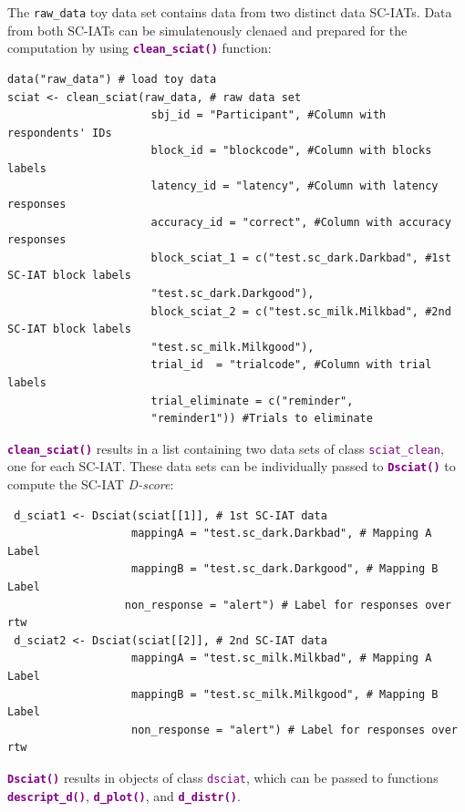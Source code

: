 \documentclass[a0,landscape]{a0poster}
\begin{document}
\begin{multicols*}{3}
The \texttt{raw\_data} toy data set contains data from two distinct data SC-IATs. Data from both SC-IATs can be simulatenously clenaed and prepared for the computation by using \textbf{\textcolor{purple}{\texttt{clean\_sciat()}}} function: 
\vspace{3mm}
\begin{lstlisting}
data("raw_data") # load toy data 
sciat <- clean_sciat(raw_data, # raw data set
                      sbj_id = "Participant", #Column with respondents' IDs
                      block_id = "blockcode", #Column with blocks labels
                      latency_id = "latency", #Column with latency responses
                      accuracy_id = "correct", #Column with accuracy responses
                      block_sciat_1 = c("test.sc_dark.Darkbad", #1st SC-IAT block labels
                      "test.sc_dark.Darkgood"),
                      block_sciat_2 = c("test.sc_milk.Milkbad", #2nd SC-IAT block labels
                      "test.sc_milk.Milkgood"),
                      trial_id  = "trialcode", #Column with trial labels
                      trial_eliminate = c("reminder", 
                      "reminder1")) #Trials to eliminate
\end{lstlisting}	
\vspace{3mm}

 \textbf{\textcolor{purple}{\texttt{clean\_sciat()}}} results in a list containing two data sets of class \textcolor{purple}{\texttt{sciat\_clean}}, one for each SC-IAT. These data sets can be individually passed to \textbf{\textcolor{purple}{\texttt{Dsciat()}}} to compute the SC-IAT \emph{D-score}: 
\vspace{3mm}
\begin{lstlisting}
 d_sciat1 <- Dsciat(sciat[[1]], # 1st SC-IAT data
                   mappingA = "test.sc_dark.Darkbad", # Mapping A Label
                   mappingB = "test.sc_dark.Darkgood", # Mapping B Label
                  non_response = "alert") # Label for responses over rtw
 d_sciat2 <- Dsciat(sciat[[2]], # 2nd SC-IAT data
                   mappingA = "test.sc_milk.Milkbad", # Mapping A Label
                   mappingB = "test.sc_milk.Milkgood", # Mapping B Label
                   non_response = "alert") # Label for responses over rtw
\end{lstlisting}	
\vspace{3mm}

\textbf{\textcolor{purple}{\texttt{Dsciat()}}} results in objects of class \textcolor{purple}{\texttt{dsciat}}, which can be passed to functions \textbf{\textcolor{purple}{\texttt{descript\_d()}}}, \textbf{\textcolor{purple}{\texttt{d\_plot()}}}, and \textbf{\textcolor{purple}{\texttt{d\_distr()}}}. 


\end{multicols*}
\end{document}
